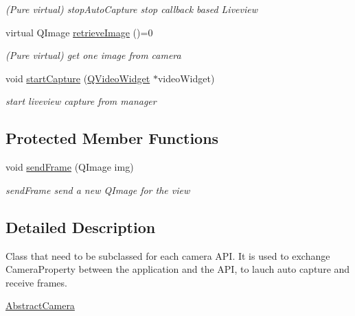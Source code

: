 \begin{DoxyCompactItemize}
\begin{DoxyCompactList}\small\item\em (Pure virtual) stop\-Auto\-Capture stop callback based Liveview \end{DoxyCompactList}\item 
virtual Q\-Image \hyperlink{class_abstract_camera_aec58ab298b618632fd422cadd11bae17}{retrieve\-Image} ()=0
\begin{DoxyCompactList}\small\item\em (Pure virtual) get one image from camera \end{DoxyCompactList}\item 
void \hyperlink{class_abstract_camera_a19c1e4a98de744a5b8567b4764ceabe0}{start\-Capture} (\hyperlink{class_q_video_widget}{Q\-Video\-Widget} $\ast$video\-Widget)
\begin{DoxyCompactList}\small\item\em start liveview capture from manager \end{DoxyCompactList}\end{DoxyCompactItemize}
\subsection*{Protected Member Functions}
\begin{DoxyCompactItemize}
\item 
void \hyperlink{class_abstract_camera_a8fa5df9ffe74c0df6e1b8d74b6bf3b9d}{send\-Frame} (Q\-Image img)
\begin{DoxyCompactList}\small\item\em send\-Frame send a new Q\-Image for the view \end{DoxyCompactList}\end{DoxyCompactItemize}


\subsection{Detailed Description}
Class that need to be subclassed for each camera A\-P\-I. It is used to exchange Camera\-Property between the application and the A\-P\-I, to lauch auto capture and receive frames. 

\hyperlink{class_abstract_camera}{Abstract\-Camera} 

